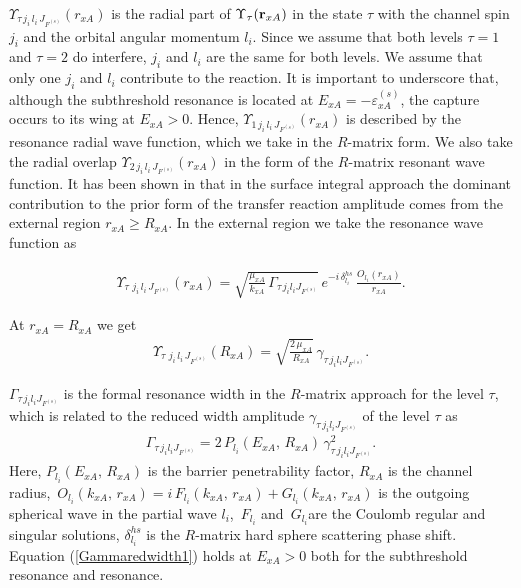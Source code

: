 \documentclass[prl,unsortedaddress,groupedaddress,twocolumn,amsmath,amsfonts,amssymb,showpacs,floatfix,nofootinbib]{revtex4}
\begin{document}
$\Upsilon_{\tau\,j_{i}\,l_{i}\,J_{F^{(s)}}}(r_{xA})$  is the radial part of  $\Upsilon_{\tau}({\rm {\bf r}}_{xA})$  in the state $\tau$ with  the channel spin $j_{i}$ and the orbital angular momentum $l_{i}$.  Since we assume that both levels $\tau=1$ and $\tau=2$ do interfere, $j_{i}$ and $l_{i}$ are the same for both levels.  We assume that only one $j_{i}$ and $l_{i}$ contribute to the reaction.
It is important to underscore that, although the subthreshold resonance is located at $E_{xA}= -\varepsilon_{xA}^{(s)}$, the capture occurs to its wing at $E_{xA} >0$. Hence, $\Upsilon_{ 1\,j_{i}\,l_{i}\,J_{F^{(s)}}}(r_{xA})$  is described by the resonance radial wave function, which we take in the $R$-matrix form.  We also take the radial overlap $\Upsilon_{ 2\,j_{i}\,l_{i}\,J_{F^{(s)}}}(r_{xA})$ in the form of the $R$-matrix resonant wave function. It has been shown in \cite{reviewpaper} that in the surface integral approach the dominant contribution to the prior form of the transfer reaction amplitude comes from the external region $r_{xA}  \geq R_{xA}$. In the external region we take the resonance wave function as
\begin{widetext}
\begin{align}
\Upsilon_{ \tau\,\,j_{i}\,l_{i}\,J_{F^{(s)}}}(r_{xA}) =  
\sqrt{\frac{\mu_{xA}}{k_{xA}}\,\Gamma_{\tau\,j_{i}l_{i}J_{F^{(s)}}}}\,e^{-i\,\delta^{hs}_{l_{i}}}\,\frac{O_{l_{i}}(r_{xA})}{r_{xA}}.
\label{extreswf1}
\end{align}
\end{widetext}
At $r_{xA}=R_{xA}$ we get 
\begin{align}
\Upsilon_{ \tau\,\,j_{i}\,l_{i}\,J_{F^{(s)}}}(R_{xA})=\sqrt{\frac{2\,\mu_{xA}}{R_{xA}}}\,\gamma_{\tau\,j_{i}l_{i}J_{F^{(s)}}}.
\label{UpsilonRxA1}
\end{align}

$\Gamma_{\tau\,j_{i}l_{i}J_{F^{(s)}}}$ is the formal resonance width in the $R$-matrix approach for the level $\tau$, which is related to the reduced width   
amplitude $\gamma_{\tau\,j_{i}l_{i}J_{F^{(s)}}}$ of the level $\tau$ as
\begin{align}
\Gamma_{\tau\,j_{i}l_{i}J_{F^{(s)}}}=2\,P_{l_{i}}(E_{xA},\,R_{xA})\,\gamma_{\tau\,j_{i}l_{i}J_{F^{(s)}}}^{2}.
\label{Gammaredwidth1}
\end{align}
Here,
$P_{l_{i}}(E_{xA},\,R_{xA})$ is the barrier penetrability factor, $R_{xA}$ is the channel radius, $\,O_{l_{i}}(k_{xA},\,r_{xA})=i\, F_{l_{i}}(k_{xA},\,r_{xA}) + G_{l_{i}}(k_{xA},\,r_{xA}) $ is the outgoing spherical wave in the partial wave $l_{i}$, $\,F_{l_i}$  and $\,G_{l_i}$are the Coulomb regular and singular solutions, $\delta_{l_{i}}^{hs}$ is the $R$-matrix hard sphere scattering phase shift.
Equation (\ref{Gammaredwidth1}) holds at $E_{xA} >0$ both for the subthreshold resonance
and resonance. 
\end{document}
